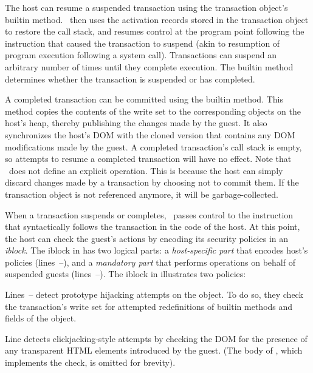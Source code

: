 The host can resume a suspended transaction using the transaction object's
builtin  method. \txjs\ then uses the activation records stored in
the transaction object to restore the call stack, and resumes control at the
program point following the instruction that caused the transaction to suspend
(akin to resumption of program execution following a system call).
Transactions can suspend an arbitrary number of times until they complete
execution. The builtin  method determines whether the
transaction is suspended or has completed. 

A completed transaction can be committed using the builtin 
method.  This method copies the contents of the write set to the corresponding
objects on the host's heap, thereby publishing the changes made by the guest.
It also synchronizes the host's DOM with the cloned version that contains any
DOM modifications made by the guest. A completed transaction's call stack is
empty, so attempts to resume a completed transaction will have no effect. Note
that \txjs\ does not define an explicit  operation.  This is
because the host can simply discard changes made by a transaction by choosing
not to commit them. If the transaction object is not referenced anymore, it
will be garbage-collected.

\label{section:motivation:iblock}
%
When a transaction suspends or completes, \txjs\ passes control to the
instruction that syntactically follows the transaction in the code of the host.
At this point, the host can check the guest's actions by encoding its security
policies in an \textit{iblock}. The iblock in 
has two logical parts: a
\textit{host-specific part} that encodes host's policies
(lines~--), and a \textit{mandatory part} that performs
operations on behalf of suspended guests (lines~--). The
iblock in  illustrates two policies:
%
\begin{mylist}
%
\item Lines~-- detect prototype hijacking attempts on the
 object. To do so, they check the transaction's write set for
attempted redefinitions of builtin methods and fields of the 
object.
%
\item Line  detects clickjacking-style attempts by checking the DOM
for the presence of any transparent HTML elements introduced by the guest. (The
body of , which implements the check, is omitted for
brevity).
%
\end{mylist}


